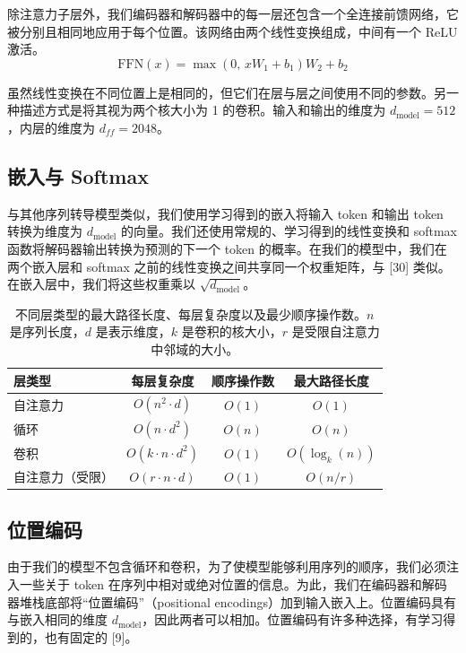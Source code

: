 \documentclass[11pt,UTF8,fontset=fandol]{ctexart}
\newcommand{\dmodel}{d_{\mathrm{model}}}
\begin{document}
除注意力子层外，我们编码器和解码器中的每一层还包含一个全连接前馈网络，它被分别且相同地应用于每个位置。该网络由两个线性变换组成，中间有一个 ReLU 激活。
\begin{equation}
\mathrm{FFN}(x) = \max(0,\, xW_1 + b_1)W_2 + b_2
\tag{2}
\end{equation}

虽然线性变换在不同位置上是相同的，但它们在层与层之间使用不同的参数。另一种描述方式是将其视为两个核大小为 1 的卷积。输入和输出的维度为 $\dmodel = 512$，内层的维度为 $d_{ff} = 2048$。

\subsection{嵌入与 Softmax}

与其他序列转导模型类似，我们使用学习得到的嵌入将输入 token 和输出 token 转换为维度为 $\dmodel$ 的向量。我们还使用常规的、学习得到的线性变换和 softmax 函数将解码器输出转换为预测的下一个 token 的概率。在我们的模型中，我们在两个嵌入层和 softmax 之前的线性变换之间共享同一个权重矩阵，与 [30] 类似。在嵌入层中，我们将这些权重乘以 $\sqrt{\dmodel}$。

\begin{table}[H]\centering
\caption{不同层类型的最大路径长度、每层复杂度以及最少顺序操作数。$n$ 是序列长度，$d$ 是表示维度，$k$ 是卷积的核大小，$r$ 是受限自注意力中邻域的大小。}
\label{tab:1}
\begin{tabular}{lccc}
\toprule
层类型 & 每层复杂度 & 顺序操作数 & 最大路径长度 \\
\midrule
自注意力 & $O(n^2 \cdot d)$ & $O(1)$ & $O(1)$ \\
循环 & $O(n \cdot d^2)$ & $O(n)$ & $O(n)$ \\
卷积 & $O(k \cdot n \cdot d^2)$ & $O(1)$ & $O(\log_k(n))$ \\
自注意力（受限） & $O(r \cdot n \cdot d)$ & $O(1)$ & $O(n/r)$ \\
\bottomrule
\end{tabular}
\end{table}

\subsection{位置编码}

由于我们的模型不包含循环和卷积，为了使模型能够利用序列的顺序，我们必须注入一些关于 token 在序列中相对或绝对位置的信息。为此，我们在编码器和解码器堆栈底部将“位置编码”（positional encodings）加到输入嵌入上。位置编码具有与嵌入相同的维度 $\dmodel$，因此两者可以相加。位置编码有许多种选择，有学习得到的，也有固定的 [9]。
\end{document}
